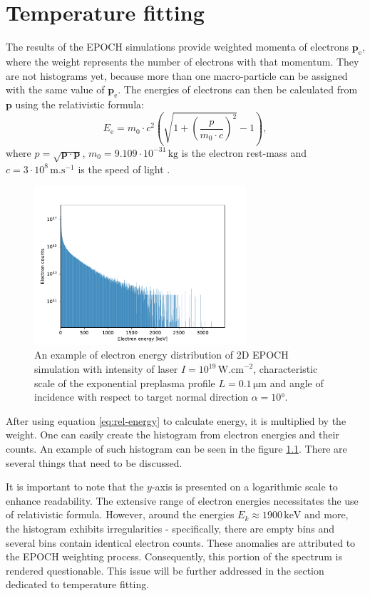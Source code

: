 \chapter{Temperature fitting}
The results of the EPOCH simulations provide weighted momenta of electrons $\bm{p}_\mathrm{e}$, where the weight represents the number of electrons with that momentum. They are not histograms yet, because more than one macro-particle can be assigned with the same value of $\bm{p}_\mathrm{e}$. The energies of electrons can then be calculated from $\bm{p}$ using the relativistic formula:
\begin{equation}
	\label{eq:rel-energy}
	E_\mathrm{e} = m_0\cdot c^2\left(\sqrt{1+\left(\frac{p}{m_0\cdot c}\right)^2} -1\right)\mathrm{,}
\end{equation}
where $p=\sqrt{\bm{p}\cdot\bm{p}}$, $m_0 =  9.109 \cdot 10^{-31} \, \mathrm{kg}$ is the electron rest-mass and $c=3\cdot 10^{8} \, \mathrm{m . s}^{-1}$ is the speed of light \cite{constants}.


\begin{figure}[h]
	\centering
	\includegraphics[width=0.7\textwidth]{figures/example-histogram}
	\caption{An example of electron energy distribution of 2D EPOCH simulation with intensity of laser $I=10^{19}\,\mathrm{W.cm}^{-2}$, characteristic scale of the exponential preplasma profile $L=0.1\,\mathrm{\mu m}$ and angle of incidence with respect to target normal direction $\alpha = 10$°.}
	\label{fig:example-histogram}
\end{figure}
After using equation \ref{eq:rel-energy} to calculate energy, it is multiplied by the weight. One can easily create the histogram from electron energies and their counts. An example of such histogram can be seen in the figure \ref{fig:example-histogram}. There are several things that need to be discussed.

It is important to note that the $y$-axis is presented on a logarithmic scale to enhance readability. The extensive range of electron energies necessitates the use of relativistic formula. However, around the energies $E_k \approx 1900 \, \mathrm{keV}$ and more, the histogram exhibits irregularities - specifically, there are empty bins and several bins contain identical electron counts. These anomalies are attributed to the EPOCH weighting process. Consequently, this portion of the spectrum is rendered questionable. This issue will be further addressed in the section dedicated to temperature fitting.

